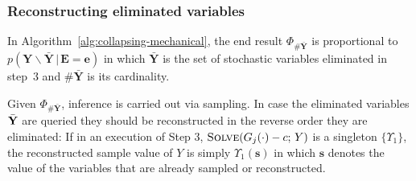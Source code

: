 \documentclass[]{article}
\newcommand{\bvec}[1]{\textbf{#1}}
\newcommand{\pr}{p}
\begin{document}
\subsubsection{Reconstructing eliminated variables}
In Algorithm~\ref{alg:collapsing-mechanical}, the end result $\Phi_{\#\bar{\bvec{Y}}}$ is proportional to 
$\pr(\bvec{Y}\backslash \bar{\bvec{Y}} \,|\, \bvec{E} = \bvec{e})$ in which 
$\bar{\bvec{Y}}$ is the set of stochastic variables eliminated in
step~3 and $\#\bar{\bvec{Y}}$ is its cardinality.

Given $\Phi_{\#\bar{\bvec{Y}}}$, inference is carried out via sampling.
In case the eliminated variables $\bar{\bf Y}$ are queried they should be reconstructed in the reverse order they are eliminated:
If in an execution of Step 3, 
{\footnotesize$\textsc{Solve}(G_j(\cdot)-c ;\, Y)$} is a singleton
{\footnotesize$\{\Upsilon_1\}$},
the reconstructed sample value of $Y$ is simply 
{\footnotesize$\Upsilon_1(\bvec{s})$} 
in which $\bvec{s}$ denotes the value of the variables that are already sampled or reconstructed. 
\end{document}
